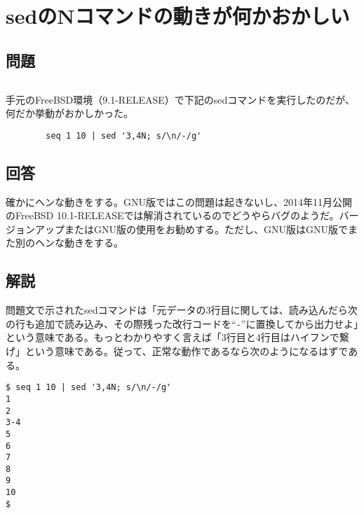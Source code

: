 \section{sedのNコマンドの動きが何かおかしい}
\label{recipe:sed}

\subsection*{問題}
\noindent
$\!\!\!\!\!$
\begin{grshfboxit}{160.0mm}
	手元のFreeBSD環境（9.1-RELEASE）で下記のsedコマンドを実行したのだが、何だか挙動がおかしかった。
	\begin{verbatim}
		seq 1 10 | sed '3,4N; s/\n/-/g'
	\end{verbatim}
\end{grshfboxit}

\subsection*{回答}
確かにヘンな動きをする。GNU版ではこの問題は起きないし、2014年11月公開のFreeBSD 10.1-RELEASEでは解消されているのでどうやらバグのようだ。バージョンアップまたはGNU版の使用をお勧めする。ただし、GNU版はGNU版でまた別のヘンな動きをする。

\subsection*{解説}

問題文で示されたsedコマンドは「元データの3行目に関しては、読み込んだら次の行も追加で読み込み、その際残った改行コードを``\verb|-|''に置換してから出力せよ」という意味である。もっとわかりやすく言えば「3行目と4行目はハイフンで繋げ」という意味である。従って、正常な動作であるなら次のようになるはずである。

\begin{screen}
	\verb!$ seq 1 10 | sed '3,4N; s/\n/-/g'! \return \\
	\verb!1! \\
	\verb!2! \\
	\verb!3-4! \\
	\verb!5! \\
	\verb!6! \\
	\verb!7! \\
	\verb!8! \\
	\verb!9! \\
	\verb!10! \\
	\verb!$ !
\end{screen}


